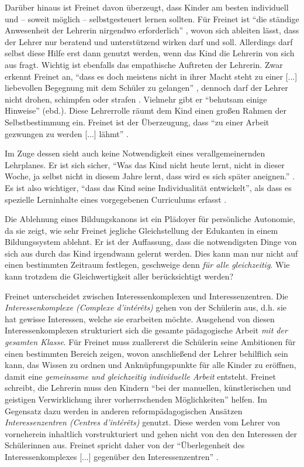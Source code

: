 Darüber hinaus ist Freinet davon überzeugt, dass Kinder am besten individuell und -- soweit möglich -- selbstgesteuert lernen sollten.
Für Freinet ist ``die ständige Anwesenheit der Lehrerin nirgendwo erforderlich'' \parencite[105]{Freinet1979}, wovon sich ableiten lässt, dass der Lehrer nur beratend und unterstützend wirken darf und soll.
Allerdings darf selbst diese Hilfe erst dann genutzt werden, wenn das Kind die Lehrerin von sich aus fragt.
Wichtig ist ebenfalls das empathische Auftreten der Lehrerin.
Zwar erkennt Freinet an, ``dass es doch meistens nicht in ihrer Macht steht zu einer [...] liebevollen Begegnung mit dem Schüler zu gelangen'' \parencite[101]{Freinet1979}, dennoch darf der Lehrer nicht drohen, schimpfen oder strafen \parencite[103]{Freinet1979}.
Vielmehr gibt er ``behutsam einige Hinweise'' (ebd.).
Diese Lehrerrolle räumt dem Kind einen großen Rahmen der Selbstbestimmung ein.
Freinet ist der Überzeugung, dass ``zu einer Arbeit gezwungen zu werden [...] lähmt'' \parencite[vgl.][S.~495]{Freinet-2000a}.

Im Zuge dessen sieht \citeauthor{Freinet1979} auch keine Notwendigkeit eines verallgemeinernden Lehrplanes.
Er ist sich sicher, ``Was das Kind nicht heute lernt, nicht in dieser Woche, ja selbst nicht in diesem Jahre lernt, dass wird es sich später aneignen.'' \parencite[~101]{Freinet1979}.
Es ist also wichtiger, ``dass das Kind seine Individualität entwickelt'', als dass es spezielle Lerninhalte eines vorgegebenen Curriculums erfasst \parencite[~105]{Freinet1979}.

Die Ablehnung eines Bildungskanons ist ein Plädoyer für persönliche Autonomie, da sie zeigt, wie sehr Freinet jegliche Gleichstellung der Edukanten in einem Bildungssystem ablehnt.
Er ist der Auffassung, dass die notwendigsten Dinge von sich aus durch das Kind irgendwann gelernt werden.
Dies kann man nur nicht auf einen bestimmten Zeitraum festlegen, geschweige denn \emph{für alle gleichzeitig}.
Wie kann trotzdem die Gleichwertigkeit aller berücksichtigt werden?

Freinet unterscheidet zwischen Interessenkomplexen und Interessenzentren.
Die \emph{Interessenkomplexe (Complexe d'intérêts)} gehen von der Schülerin aus, d.h. sie hat gewisse Interessen, welche sie erarbeiten möchte.
Ausgehend von diesen Interessenkomplexen strukturiert sich die gesamte pädagogische Arbeit \emph{mit der gesamten Klasse}.
Für Freinet muss zuallererst die Schülerin seine Ambitionen für einen bestimmten Bereich zeigen, wovon anschließend der Lehrer behilflich sein kann, das Wissen zu ordnen und Anknüpfungspunkte für alle Kinder zu eröffnen, damit eine \emph{gemeinsame und gleichzeitig individuelle Arbeit} entsteht.
Freinet schreibt, die Lehrerin muss den Kindern ``bei der manuellen, künstlerischen und geistigen Verwirklichung ihrer vorherrschenden Möglichkeiten'' \parencite[~90]{Freinet1979} helfen.
Im Gegensatz dazu werden in anderen reformpädagogischen Ansätzen \emph{Interessenzentren (Centres d'intérêts)} genutzt.
Diese werden vom Lehrer von vorneherein inhaltlich vorstrukturiert und gehen nicht von den den Interessen der Schülerinnen aus.
Freinet spricht daher von der ``Überlegenheit des Interessenkomplexes [...] gegenüber den Interessenzentren'' \parencite[~89]{Freinet1979}.

